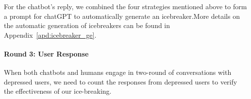For the chatbot's reply, we combined the four strategies mentioned above to form a prompt for chatGPT to automatically generate an icebreaker.More details on the automatic generation of icebreakers can be found in Appendix~\ref{apd:icebreaker_ge}.

\paragraph{Round 3: User Response}
When both chatbots and humans engage in two-round of conversations with depressed users, we need to count the responses from depressed users to verify the effectiveness of our ice-breaking.